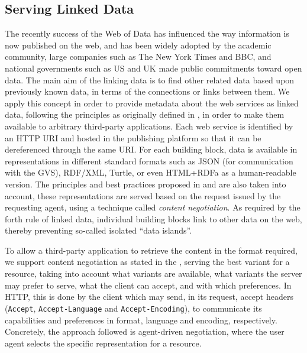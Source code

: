 
\subsection{Serving Linked Data} %
\label{sub:linked_data}

The recently success of the Web of Data has influenced the way information is now published on the web, and has been widely adopted by the academic community, large companies such as The New York Times and BBC, and national governments such as US and UK made public commitments toward open data. The main aim of the linking data is to find other related data based upon previously known data, in terms of the connections or links between them. We apply this concept in order to provide metadata about the web services as linked data, following the principles as originally defined in \cite{bizer_ijswis2009}, in order to make them available to arbitrary third-party applications. Each web service is identified by an HTTP URI and hosted in the publishing platform so that it can be dereferenced through the same URI. For each building block, data is available in representations in different standard formats such as JSON (for communication with the GVS), RDF/XML, Turtle, or even HTML+RDFa as a human-readable version. The principles and best practices proposed in \cite{berrueta2008} and \cite{sauermann2008cool_uris} are also taken into account, these representations are served based on the request issued by the requesting agent, using a technique called \emph{content negotiation}. As required by the forth rule of linked data, individual building blocks link to other data on the web, thereby preventing so-called isolated ``data islands''.

To allow a third-party application to retrieve the content in the format required, we support content negotiation as stated in the \cite{http1.1}, serving the best variant for a resource, taking into account what variants are available, what variants the server may prefer to serve, what the client can accept, and with which preferences. In HTTP, this is done by the client which may send, in its request, accept headers (\texttt{Accept}, \texttt{Accept-Language} and \texttt{Accept-Encoding}), to communicate its capabilities and preferences in format, language and encoding, respectively. Concretely, the approach followed is agent-driven negotiation, where the user agent selects the specific representation for a resource.
